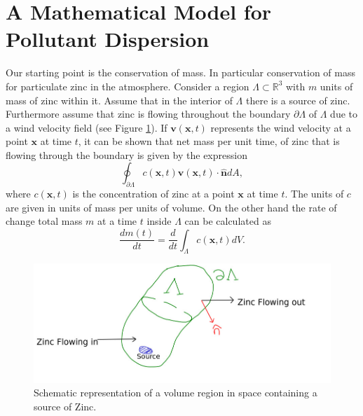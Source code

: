 \documentclass[12pt]{book}
\newcommand{\x}{\textbf{x}}
\newcommand{\vv}{\textbf{v}}
\begin{document}
\section{A Mathematical Model for Pollutant Dispersion}
Our starting point  is the conservation of mass. In particular conservation of mass for
particulate zinc in the atmosphere. Consider a region $\Lambda\subset\mathbb{R}^{3}$ with $m$ units of   mass
of zinc within it. 
Assume
that in the interior of $\Lambda$ there is  a source of  zinc. Furthermore assume that zinc is flowing throughout 
the boundary $\partial\Lambda$ of $\Lambda$  due to a  wind velocity field (see Figure \ref{figControlVolume}).
If $\vv(\x,t)$ represents the wind velocity at a point $\x$ at time $t$, it can be shown that net mass
per unit time, of zinc that is flowing through the boundary is given by the expression
\cite{seinfeld1998atmospheric}
\begin{equation*}
\oint_{\partial\Lambda}c(\x,t)\vv(\x,t)\cdot\hat{\textbf{n}}dA,
\end{equation*}
where  $c(\x,t)$ is the concentration of zinc at a point $\x$
at time $t$.
The units of $c$ are given in units of mass per units of volume. On the other hand
the rate of change total mass $m$ at a time $t$ inside $\Lambda$  can be calculated as
\begin{equation*}
\frac{dm(t)}{dt}=\frac{d}{dt}\int_{\Lambda}c(\x,t)dV.
\end{equation*}

\begin{figure}[H]
\centering
\includegraphics[scale=0.5]{./FigChap4/controlVolume}
\caption{Schematic representation of a volume region in space containing a source of Zinc.}
\label{figControlVolume}
\end{figure}
\end{document}
